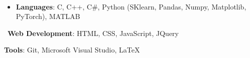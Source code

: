 \documentclass[a4paper,10pt]{article}
\begin{document}
\\[-0.3cm]
\begin{itemize}
  \item \textbf{Languages}: C, C++,  C\#, Python (SKlearn, Pandas, Numpy, Matplotlib, PyTorch), MATLAB \\[-0.5cm]
\end{itemize}
\begin{itemize*}[series=MyList, before=\hspace{3.3ex}]
    \item \ \textbf{Web Development}: HTML, CSS,
  JavaScript, JQuery \ \ \ \ \ \
    \item \textbf{Tools}: Git, Microsoft Visual Studio, \LaTeX
  \end{itemize*}
\end{document}
